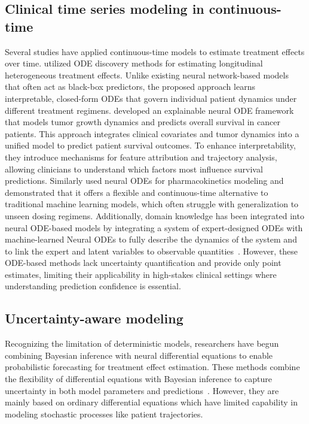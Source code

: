 \documentclass[preprint,12pt]{elsarticle}
\begin{document}
\subsection{Clinical time series modeling in continuous-time}
Several studies have applied continuous-time models to estimate treatment effects over time. \citet{kacprzyk2024ode} utilized ODE discovery methods for estimating longitudinal heterogeneous treatment effects. Unlike existing neural network-based models that often act as black-box predictors, the proposed approach learns interpretable, closed-form ODEs that govern individual patient dynamics under different treatment regimens.
\citet{laurie2023explainable} developed an explainable neural ODE framework that models tumor growth dynamics and predicts overall survival in cancer patients. This approach integrates clinical covariates and tumor dynamics into a unified model to predict patient survival outcomes. To enhance interpretability, they introduce mechanisms for feature attribution and trajectory analysis, allowing clinicians to understand which factors most influence survival predictions. Similarly \citet{lu2021neural} used neural ODEs for pharmacokinetics modeling and demonstrated that it offers a flexible and continuous-time alternative to traditional machine learning models, which often struggle with generalization to unseen dosing regimens. Additionally, domain knowledge has been integrated into neural ODE-based models by integrating a system of expert-designed ODEs with machine-learned Neural ODEs to fully describe the dynamics of the system and to link the expert and latent variables to observable quantities~\citep{qian2021integrating}.
However, these ODE-based methods lack uncertainty quantification and provide only point estimates, limiting their applicability in high-stakes clinical settings where understanding prediction confidence is essential.

\subsection{Uncertainty-aware modeling}
Recognizing the limitation of deterministic models, researchers have begun combining Bayesian inference with neural differential equations to enable probabilistic forecasting for treatment effect estimation. These methods combine the flexibility of differential equations with Bayesian inference to capture uncertainty in both model parameters and predictions~\citep{hess2023bayesian,de2022predicting}. However, they are mainly based on ordinary differential equations which have limited capability in modeling stochastic processes like patient trajectories. 
\end{document}
